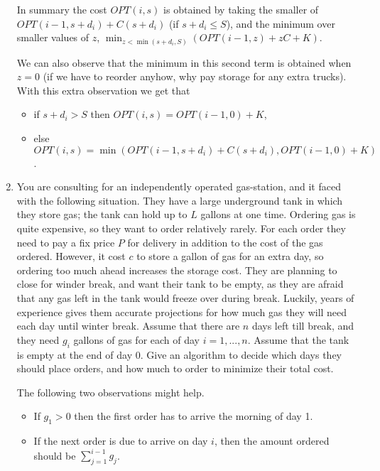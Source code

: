 \documentclass[12pt]{article}
\def\opt{{OPT}}
\def\opt{{OPT}}
\begin{document}
\begin{enumerate}
{\begin{itemize}
In summary the cost $\opt(i,s)$ is obtained by taking the smaller
of $\opt(i-1,s+d_i)+C(s+d_i)$ (if $s+d_i \le S$), and the minimum over
smaller values of $z$, $\min_{z <\min(s+d_i,S)} (\opt(i-1, z)+zC+K)$.

We can also observe that the minimum in this second term is
obtained when $z=0$ (if we have to reorder anyhow, why pay storage for
any extra trucks). With this extra observation we get that
\begin{itemize}
\item if $s+d_i>S$ then $\opt(i,s)=\opt(i-1,0)+K$,
\item else $\opt(i,s)=\min(\opt(i-1,s+d_i)+C(s+d_i), \opt(i-1,0)+K)$.
\end{itemize}
\end{itemize}

}


\item

You are consulting for an independently operated gas-station,
and it faced with the following situation.
They have a large underground tank in which they store gas;
the tank can hold up to $L$ gallons at one time.
Ordering gas is quite expensive, so they want to order relatively rarely.  
For each order
they need to pay a fix price $P$ for delivery in addition to the cost
of the gas ordered. However, it cost $c$ to store a gallon of gas for an
extra day, so ordering too much ahead increases the storage cost. They are
planning to close for winder break, and want their tank to be empty, as they
are afraid that any gas left in the tank would freeze over during break.
Luckily, years of experience gives them accurate projections for
how much gas they will need each day until winter break. 
Assume that there are $n$ days left till break, and
they need $g_i$ gallons of gas for each of day $i=1,...,n$. Assume that the
tank is empty at the end of day 0. Give an algorithm to decide which days
they should place orders, and how much to order to minimize their total cost.

The following two observations might help.
\begin{itemize}
\item If $g_1 >0$ then the first
order has to arrive the morning of day 1.
\item If the next order is due to
arrive on day $i$, then the amount ordered should be $\sum_{j=1}^{i-1}g_j$.
\end{itemize}



\end{enumerate}
\end{document}

